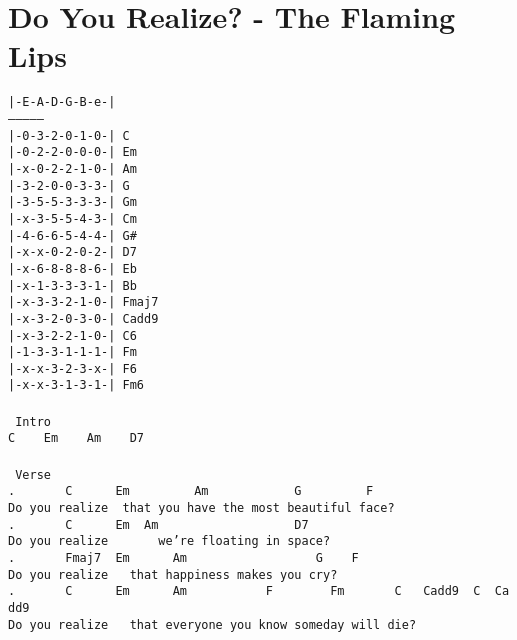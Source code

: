 \newpage
\section{Do You Realize? - The Flaming Lips}
\label{Do You Realize? - The Flaming Lips}
\texttt{|-E-A-D-G-B-e-|\\
---------------\\
|-0-3-2-0-1-0-|\ C\\
|-0-2-2-0-0-0-|\ Em\\
|-x-0-2-2-1-0-|\ Am\\
|-3-2-0-0-3-3-|\ G\\
|-3-5-5-3-3-3-|\ Gm\\
|-x-3-5-5-4-3-|\ Cm\\
|-4-6-6-5-4-4-|\ G\#\\
|-x-x-0-2-0-2-|\ D7\\
|-x-6-8-8-8-6-|\ Eb\\
|-x-1-3-3-3-1-|\ Bb\\
|-x-3-3-2-1-0-|\ Fmaj7\\
|-x-3-2-0-3-0-|\ Cadd9\\
|-x-3-2-2-1-0-|\ C6\\
|-1-3-3-1-1-1-|\ Fm\\
|-x-x-3-2-3-x-|\ F6\\
|-x-x-3-1-3-1-|\ Fm6\\
\\
\lbrack\ Intro\rbrack\\
C\ \ \ \ Em\ \ \ \ Am\ \ \ \ D7\\
\\
\lbrack\ Verse\rbrack\\
.\ \ \ \ \ \ \ C\ \ \ \ \ \ Em\ \ \ \ \ \ \ \ \ Am\ \ \ \ \ \ \ \ \ \ \ \ G\ \ \ \ \ \ \ \ \ F\\
Do\ you\ realize\ \ that\ you\ have\ the\ most\ beautiful\ face?\\
.\ \ \ \ \ \ \ C\ \ \ \ \ \ Em\ \ Am\ \ \ \ \ \ \ \ \ \ \ \ \ \ \ \ \ \ \ D7\\
Do\ you\ realize\ \ \ \ \ \ \ we're\ floating\ in\ space?\\
.\ \ \ \ \ \ \ Fmaj7\ \ Em\ \ \ \ \ \ Am\ \ \ \ \ \ \ \ \ \ \ \ \ \ \ \ \ \ G\ \ \ \ F\ \\
Do\ you\ realize\ \ \ that\ happiness\ makes\ you\ cry?\\
.\ \ \ \ \ \ \ C\ \ \ \ \ \ Em\ \ \ \ \ \ Am\ \ \ \ \ \ \ \ \ \ \ F\ \ \ \ \ \ \ \ Fm\ \ \ \ \ \ \ C\ \ \ Cadd9\ \ C\ \ Cadd9\\
Do\ you\ realize\ \ \ that\ everyone\ you\ know\ someday\ will\ die?\\
}
